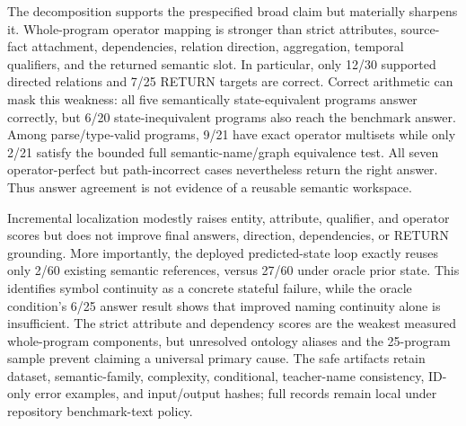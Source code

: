 \documentclass[11pt]{article}
\begin{document}
\begin{table}[t]
\centering\small
\caption{Fine-grained program semantics by frozen condition. Reuse is exact
reuse of an existing gold semantic path over 60 transition references and is
undefined for standalone whole-program synthesis. Other columns are program-level
micro-F1 except direction and RETURN, which are support-aware accuracies.}
\label{tab:asl-semantic-conditions}
\end{table}

The decomposition supports the prespecified broad claim but materially sharpens
it. Whole-program operator mapping is stronger than strict attributes,
source-fact attachment, dependencies, relation direction, aggregation, temporal
qualifiers, and the returned semantic slot. In particular, only 12/30 supported
directed relations and 7/25 RETURN targets are correct. Correct arithmetic can
mask this weakness: all five semantically state-equivalent programs answer
correctly, but 6/20 state-inequivalent programs also reach the benchmark answer.
Among parse/type-valid programs, 9/21 have exact operator multisets while only
2/21 satisfy the bounded full semantic-name/graph equivalence test. All seven
operator-perfect but path-incorrect cases nevertheless return the right answer.
Thus answer agreement is not evidence of a reusable semantic workspace.

Incremental localization modestly raises entity, attribute, qualifier, and
operator scores but does not improve final answers, direction, dependencies, or
RETURN grounding. More importantly, the deployed predicted-state loop exactly
reuses only 2/60 existing semantic references, versus 27/60 under oracle prior
state. This identifies symbol continuity as a concrete stateful failure, while
the oracle condition's 6/25 answer result shows that improved naming continuity
alone is insufficient. The strict attribute and dependency scores are the
weakest measured whole-program components, but unresolved ontology aliases and
the 25-program sample prevent claiming a universal primary cause. The safe
artifacts retain dataset, semantic-family, complexity, conditional, teacher-name
consistency, ID-only error examples, and input/output hashes; full records remain
local under repository benchmark-text policy.
\end{document}
